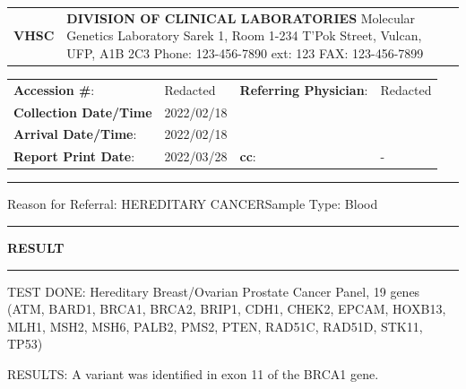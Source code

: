 \documentclass[10pt]{article}
\begin{document}
\begin{tabular}{p{3cm} >{\centering\arraybackslash}p{12.5cm} p{3cm}}
{\Huge \bf VHSC} & {\Large \bf DIVISION OF CLINICAL LABORATORIES} \newline
Molecular Genetics Laboratory \newline
Sarek 1, Room 1-234 \newline
56 T'Pok Street, Vulcan, UFP, A1B 2C3 \newline
Phone: 123-456-7890 ext: 123 FAX: 123-456-7899 \newline \\
\end{tabular}


\begin{tabular}{p{4cm} p{5cm} p{4cm} p{5cm}}
{\bf Accession \#}: & Redacted & {\bf Referring Physician}: & Redacted\\
{\bf Collection Date/Time} & 2022/02/18 & & \\
{\bf Arrival Date/Time}: & 2022/02/18 & & \\
{\bf Report Print Date}: & 2022/03/28 & {\bf cc}: & - \\
\end{tabular}

\rule{\textwidth}{0.5mm}

Reason for Referral: HEREDITARY CANCER\hfill Sample Type: Blood

\rule{\textwidth}{0.5mm}
\vspace{-2.8em}
\begin{center}{\large \bf RESULT}\end{center}
\vspace{-2.3em}
\rule{\textwidth}{0.5mm}

TEST DONE: Hereditary Breast/Ovarian Prostate Cancer Panel, 19 genes (ATM, BARD1, BRCA1, BRCA2, BRIP1, CDH1, CHEK2, EPCAM, HOXB13, MLH1, MSH2, MSH6, PALB2, PMS2, PTEN, RAD51C, RAD51D, STK11, TP53)

RESULTS: A variant was identified in exon 11 of the BRCA1 gene.
\end{document}
